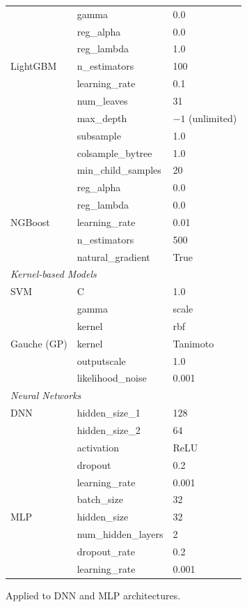 \documentclass[pdflatex,sn-mathphys-num]{sn-jnl}%
\theoremstyle{thmstyleone}%
\theoremstyle{thmstyletwo}%
\theoremstyle{thmstylethree}%
\begin{document}
\begin{appendices}
\begin{table}[h]
\begin{tabular}{@{}lll@{}}
        & gamma & 0.0 \\
        & reg\_alpha & 0.0 \\
        & reg\_lambda & 1.0 \\
\addlinespace
LightGBM & n\_estimators & 100 \\
         & learning\_rate & 0.1 \\
         & num\_leaves & 31 \\
         & max\_depth & $-1$ (unlimited) \\
         & subsample & 1.0 \\
         & colsample\_bytree & 1.0 \\
         & min\_child\_samples & 20 \\
         & reg\_alpha & 0.0 \\
         & reg\_lambda & 0.0 \\
\addlinespace
NGBoost & learning\_rate & 0.01 \\
        & n\_estimators & 500 \\
        & natural\_gradient & True \\
\midrule
\multicolumn{3}{l}{\textit{Kernel-based Models}} \\
\midrule
SVM & C & 1.0 \\
    & gamma & scale \\
    & kernel & rbf \\
\addlinespace
Gauche (GP) & kernel & Tanimoto \\
            & outputscale & 1.0 \\
            & likelihood\_noise & 0.001 \\
\midrule
\multicolumn{3}{l}{\textit{Neural Networks}} \\
\midrule
DNN & hidden\_size\_1 & 128 \\
    & hidden\_size\_2 & 64 \\
    & activation & ReLU \\
    & dropout & 0.2 \\
    & learning\_rate & 0.001 \\
    & batch\_size & 32 \\
\addlinespace
MLP & hidden\_size & 32 \\
    & num\_hidden\_layers & 2 \\
    & dropout\_rate & 0.2 \\
    & learning\_rate & 0.001 \\
\bottomrule
\end{tabular}
\begin{tablenotes}
\small
\item[a] Applied to DNN and MLP architectures.
\end{tablenotes}
\end{table}



\end{appendices}
\end{document}
